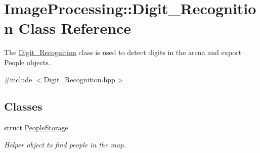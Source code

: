 \hypertarget{class_image_processing_1_1_digit___recognition}{}\section{Image\+Processing\+:\+:Digit\+\_\+\+Recognition Class Reference}
\label{class_image_processing_1_1_digit___recognition}


The \mbox{\hyperlink{class_image_processing_1_1_digit___recognition}{Digit\+\_\+\+Recognition}} class is used to detect digits in the arena and export People objects.  




{\ttfamily \#include $<$Digit\+\_\+\+Recognition.\+hpp$>$}

\subsection*{Classes}
\begin{DoxyCompactItemize}
\item 
struct \mbox{\hyperlink{struct_image_processing_1_1_digit___recognition_1_1_people_storage}{People\+Storage}}
\begin{DoxyCompactList}\small\item\em Helper object to find people in the map. \end{DoxyCompactList}\end{DoxyCompactItemize}
